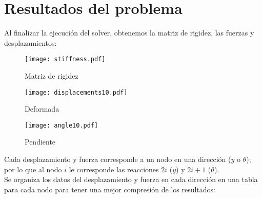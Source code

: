 \documentclass[12pt,a4paper]{article}
\begin{document}
\section{Resultados del problema}
Al finalizar la ejecución del solver, obtenemos la matriz de rigidez, las fuerzas y desplazamientos:
\begin{figure}[H]
    \centering
    \texttt{[image: stiffness.pdf]}
    \caption{Matriz de rigidez}
\end{figure}
\begin{figure}[H]
    \centering
    \texttt{[image: displacements10.pdf]}
    \caption{Deformada}
\end{figure}
\begin{figure}[H]
    \centering
    \texttt{[image: angle10.pdf]}
    \caption{Pendiente}
\end{figure}
Cada desplazamiento y fuerza corresponde a un nodo en una dirección ($y$ o $\theta$); por lo que al nodo $i$ le corresponde las reacciones $2i$ ($y$) y $2i+1$ ($\theta$).\\
Se organiza los datos del desplazamiento y fuerza en cada dirección en una tabla para cada nodo para tener una mejor compresión de los resultados:
\end{document}
